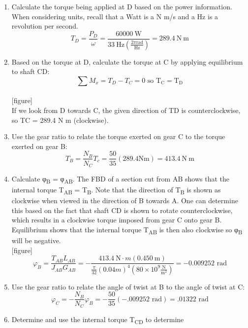 \documentclass[
  letterpaper,
  DIV=11,
  numbers=noendperiod]{scrreprt}
\providecommand{\tightlist}{%
  \setlength{\itemsep}{0pt}\setlength{\parskip}{0pt}}\usepackage{longtable,booktabs,array}
\begin{document}
\begin{tcolorbox}
\begin{tcolorbox}
\begin{enumerate}
\def\labelenumi{\arabic{enumi}.}
\tightlist
\item
  Calculate the torque being applied at D based on the power
  information. When considering units, recall that a Watt is a N m/s and
  a Hz is a revolution per second.\\
  \[
  T_D=\frac{P_D}{\omega}=\frac{60000 \mathrm{~W}}{33 \mathrm{~Hz}\left(\frac{2 \pi \mathrm{rad}}{\mathrm{Hz}}\right)}=289.4 \mathrm{~N} \mathrm{~m}
  \]
\item
  Based on the torque at D, calculate the torque at C by applying
  equilibrium to shaft CD:\\
  \[
  \sum M_x=T_D-T_C=0 \text { so } \mathrm{T}_{\mathrm{C}}=\mathrm{T}_{\mathrm{D}}
  \]\\
  {[}figure{]}\\
  If we look from D towards C, the given direction of TD is
  counterclockwise, so TC = 289.4 N m (clockwise).
\item
  Use the gear ratio to relate the torque exerted on gear C to the
  torque exerted on gear B:\\
  \[
  T_B=\frac{N_B}{N_C} T_c=\frac{50}{35}(289.4 \mathrm{Nm})=413.4 \mathrm{~N} \mathrm{~m}
  \]
\item
  Calculate φ\textsubscript{B} = φ\textsubscript{AB}. The FBD of a
  section cut from AB shows that the internal torque T\textsubscript{AB}
  = T\textsubscript{B}. Note that the direction of T\textsubscript{B} is
  shown as clockwise when viewed in the direction of B towards A. One
  can determine this based on the fact that shaft CD is shown to rotate
  counterclockwise, which results in a clockwise torque imposed from
  gear C onto gear B. Equilibrium shows that the internal torque
  T\textsubscript{AB} is then also clockwise so φ\textsubscript{B} will
  be negative.\\
  {[}figure{]}\\
  \[
  \varphi_B=\frac{T_{A B} L_{A B}}{J_{A B} G_{A B}}=-\frac{413.4 \mathrm{~N} \cdot m(0.450 \mathrm{~m})}{\frac{\pi}{32}(0.04 m)^4\left(80 \times 10^9 \frac{\mathrm{N}}{\mathrm{m}^2}\right)}=-0.009252 \text{ rad}
  \]
\item
  Use the gear ratio to relate the angle of twist at B to the angle of
  twist at C:\\
  \[
  \varphi_C=-\frac{N_B}{N_C} \varphi_B=-\frac{50}{35}(-.009252 \text{ rad})=.01322 \text{ rad}
  \]
\item
  Determine and use the internal torque T\textsubscript{CD} to determine

\end{enumerate}
\end{tcolorbox}
\end{tcolorbox}
\end{document}
